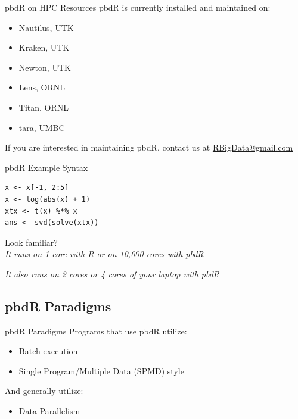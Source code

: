 \begin{frame}
  \begin{block}{pbdR on HPC Resources}
    pbdR is currently installed and maintained on:
    \begin{itemize}
      \item Nautilus, UTK
      \item Kraken, UTK
      \item Newton, UTK
      \item Lens, ORNL
      \item Titan, ORNL
      \item tara, UMBC

    \end{itemize}
    If you are interested in maintaining pbdR, contact us at 
\url{RBigData@gmail.com}
  \end{block}
\end{frame}

\begin{frame}[fragile]
  \begin{block}{pbdR Example Syntax}
  \begin{lstlisting}
x <- x[-1, 2:5]
x <- log(abs(x) + 1)
xtx <- t(x) %*% x
ans <- svd(solve(xtx))
  \end{lstlisting}
  \begin{center}
  Look familiar?\\[.4cm]
  \emph{It runs on 1 core with R or on 10,000 cores with pbdR}

  \vspace{1em}
  \emph{It also runs on 2 cores or 4 cores of your laptop with pbdR}
  \end{center}
  \end{block}
\end{frame}

\subsection{pbdR Paradigms}

\begin{frame}
  \begin{block}{pbdR Paradigms}
  Programs that use pbdR utilize:
  \begin{itemize}[<+-|alert@+>]
   \item Batch execution
   \item Single Program/Multiple Data (SPMD) style
   \\[.2cm]
   \end{itemize}
    And generally utilize:
   \begin{itemize}
   \item Data Parallelism
  \end{itemize}
  \end{block}
\end{frame}


